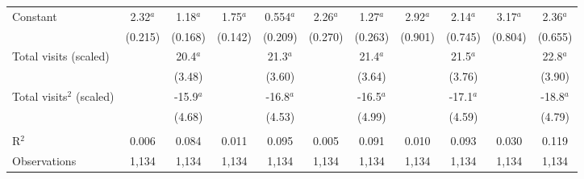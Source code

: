 \begin{tabular}{lcccccccccc}
   Constant                  & 2.32$^{a}$   & 1.18$^{a}$   & 1.75$^{a}$ & 0.554$^{a}$ & 2.26$^{a}$   & 1.27$^{a}$  & 2.92$^{a}$  & 2.14$^{a}$  & 3.17$^{a}$   & 2.36$^{a}$\\   
                             & (0.215)      & (0.168)      & (0.142)    & (0.209)     & (0.270)      & (0.263)     & (0.901)     & (0.745)     & (0.804)      & (0.655)\\   
   Total visits (scaled)     &              & 20.4$^{a}$   &            & 21.3$^{a}$  &              & 21.4$^{a}$  &             & 21.5$^{a}$  &              & 22.8$^{a}$\\   
                             &              & (3.48)       &            & (3.60)      &              & (3.64)      &             & (3.76)      &              & (3.90)\\   
   Total visits$^2$ (scaled) &              & -15.9$^{a}$  &            & -16.8$^{a}$ &              & -16.5$^{a}$ &             & -17.1$^{a}$ &              & -18.8$^{a}$\\   
                             &              & (4.68)       &            & (4.53)      &              & (4.99)      &             & (4.59)      &              & (4.79)\\   
    \\
   R$^2$                     & 0.006        & 0.084        & 0.011      & 0.095       & 0.005        & 0.091       & 0.010       & 0.093       & 0.030        & 0.119\\  
   Observations              & 1,134        & 1,134        & 1,134      & 1,134       & 1,134        & 1,134       & 1,134       & 1,134       & 1,134        & 1,134\\  
   \bottomrule
\end{tabular}
\par\endgroup


